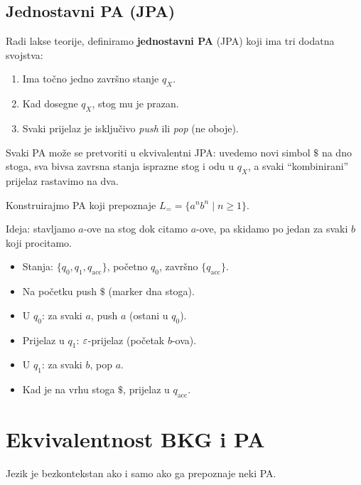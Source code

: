 \subsection{Jednostavni PA (JPA)}

Radi lakse teorije, definiramo \textbf{jednostavni PA} (JPA) koji ima
tri dodatna svojstva:
\begin{enumerate}
  \item Ima točno jedno završno stanje $q_X$.
  \item Kad dosegne $q_X$, stog mu je prazan.
  \item Svaki prijelaz je isključivo \emph{push} ili \emph{pop} (ne oboje).
\end{enumerate}

Svaki PA može se pretvoriti u ekvivalentni JPA: uvedemo novi simbol
$\$$ na dno stoga, sva bivsa zavrsna stanja isprazne stog i odu u $q_X$,
a svaki ``kombinirani'' prijelaz rastavimo na dva.

\begin{primjer}[PA za $L_=$]
Konstruirajmo PA koji prepoznaje $L_= = \{a^n b^n \mid n \geq 1\}$.

Ideja: stavljamo $a$-ove na stog dok citamo $a$-ove, pa skidamo
po jedan za svaki $b$ koji procitamo.

\begin{itemize}
  \item Stanja: $\{q_0, q_1, q_\text{acc}\}$, početno $q_0$, završno $\{q_\text{acc}\}$. 
  \item Na početku push $\$$ (marker dna stoga).
  \item U $q_0$: za svaki $a$, push $a$ (ostani u $q_0$).
  \item Prijelaz u $q_1$: $\varepsilon$-prijelaz (početak $b$-ova).
  \item U $q_1$: za svaki $b$, pop $a$.
  \item Kad je na vrhu stoga $\$$, prijelaz u $q_\text{acc}$.
\end{itemize}
\end{primjer}

\section{Ekvivalentnost BKG i PA}

\begin{propozicija}
Jezik je bezkontekstan ako i samo ako ga prepoznaje neki PA.
\end{propozicija}

